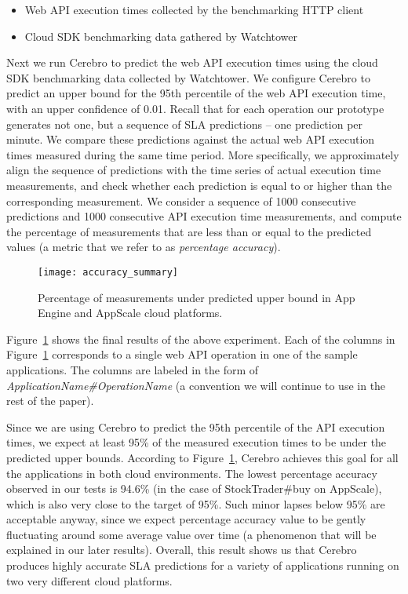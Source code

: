 \begin{itemize}
\item Web API execution times collected by the benchmarking HTTP client
\item Cloud SDK benchmarking data gathered by Watchtower
\end{itemize}

Next we run Cerebro to predict the web API execution times using the cloud SDK benchmarking data
collected by Watchtower. We configure Cerebro to predict an upper bound for the 95th percentile of the web API
execution time, with an upper confidence of 0.01. Recall that for each operation our prototype generates not one, 
but a sequence of SLA predictions -- one prediction per minute. 
We compare these predictions against the actual web API execution times measured during the same
time period. More specifically, we approximately align the sequence of predictions with the time series of actual execution
time measurements, and check whether each prediction is equal to or higher than the corresponding measurement. We consider a 
sequence of 1000 consecutive predictions and 1000 consecutive API execution
time measurements, and compute the percentage of measurements that are less than or equal to the predicted values (a
metric that we refer to as \textit{percentage accuracy}).

\begin{figure}
\centering
\texttt{[image: accuracy\_summary]}
\caption{Percentage of measurements under predicted upper bound in App Engine and AppScale cloud platforms.}
\label{fig:accuracy_summary}
\end{figure}

Figure~\ref{fig:accuracy_summary} shows the final results of the above experiment.
Each of the columns in Figure~\ref{fig:accuracy_summary} corresponds to a single web API operation in 
one of the sample applications. The columns are labeled in the form of \textit{ApplicationName\#OperationName} (a convention 
we will continue to use in the rest of the paper). %

Since we are using Cerebro to predict the 95th percentile of the API execution times, we expect at least 95\% of the measured execution
times to be under the predicted upper bounds. According to Figure~\ref{fig:accuracy_summary}, Cerebro achieves this goal for all
the applications in both cloud environments. The lowest percentage accuracy observed
in our tests is 94.6\% (in the case of StockTrader\#buy on AppScale), which is also very close to the target of 95\%. Such minor
lapses below 95\% are acceptable anyway, since we expect percentage accuracy value to be gently fluctuating around some
average value over time (a phenomenon that will be explained in our later results). Overall, this result shows us that
Cerebro produces highly accurate SLA predictions for a variety of applications running on two very
different cloud platforms.

